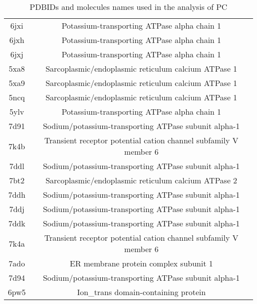 \documentclass{article}
\begin{document}
\begin{table}[]
\begin{tabular}{c|c}
6jxi & Potassium-transporting ATPase alpha chain 1 \\ 
6jxh & Potassium-transporting ATPase alpha chain 1 \\ 
6jxj & Potassium-transporting ATPase alpha chain 1 \\ 
5xa8 & Sarcoplasmic/endoplasmic reticulum calcium ATPase 1 \\ 
5xa9 & Sarcoplasmic/endoplasmic reticulum calcium ATPase 1 \\ 
5ncq & Sarcoplasmic/endoplasmic reticulum calcium ATPase 1 \\ 
5ylv & Potassium-transporting ATPase alpha chain 1 \\ 
7d91 & Sodium/potassium-transporting ATPase subunit alpha-1 \\ 
7k4b & Transient receptor potential cation channel subfamily V member 6 \\ 
7ddl & Sodium/potassium-transporting ATPase subunit alpha-1 \\ 
7bt2 & Sarcoplasmic/endoplasmic reticulum calcium ATPase 2 \\ 
7ddh & Sodium/potassium-transporting ATPase subunit alpha-1 \\ 
7ddj & Sodium/potassium-transporting ATPase subunit alpha-1 \\ 
7ddk & Sodium/potassium-transporting ATPase subunit alpha-1 \\ 
7k4a & Transient receptor potential cation channel subfamily V member 6 \\ 
7ado & ER membrane protein complex subunit 1 \\ 
7d94 & Sodium/potassium-transporting ATPase subunit alpha-1 \\ 
6pw5 & Ion\_trans domain-containing protein \\ 
    \end{tabular}
    \caption{PDBIDs and molecules names used in the analysis of PC}
    \label{tab:my_label}
\end{table}
\end{document}
